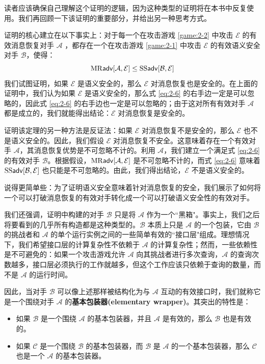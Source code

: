 读者应该确保自己理解这个证明的逻辑，因为这种类型的证明将在本书中反复使用。我们再回顾一下该证明的重要部分，并给出另一种思考方式。

证明的核心建立在以下事实上：对于每一个在攻击游戏 \ref{game:2-2} 中攻击 $\mathcal{E}$ 的有效消息恢复对手 $\mathcal{A}$ ，都存在一个在攻击游戏 \ref{game:2-1} 中攻击 $\mathcal{E}$ 的有效语义安全对手 $\mathcal{B}$，使得：
\begin{equation}\label{eq:2-6}
{\rm MR\mathsf{adv}}[\mathcal{A},\mathcal{E}]\leq{\rm SS\mathsf{adv}}[\mathcal{B},\mathcal{E}]
\end{equation}
我们试图证明，如果 $\mathcal{E}$ 是语义安全的，那么 $\mathcal{E}$ 对消息恢复也是安全的。在上面的证明中，我们认为如果 $\mathcal{E}$ 是语义安全的，那么式 \ref{eq:2-6} 的右手边一定是可以忽略的，因此式 \ref{eq:2-6} 的右手边也一定是可以忽略的；由于这对所有有效对手 $\mathcal{A}$ 都是成立的，我们就能得出结论：$\mathcal{E}$ 对消息恢复是安全的。

证明该定理的另一种方法是反证法：如果 $\mathcal{E}$ 对消息恢复不是安全的，那么 $\mathcal{E}$ 也不是语义安全的。因此，我们假设 $\mathcal{E}$ 对消息恢复不安全。这意味着存在一个有效对手 $\mathcal{A}$，其消息恢复优势是不可忽略不计的。利用 $\mathcal{A}$，我们建立一个满足式 \ref{eq:2-6} 的有效对手 $\mathcal{B}$。根据假设，${\rm MR\mathsf{adv}}[\mathcal{A},\mathcal{E}]$ 是不可忽略不计的，而式 \ref{eq:2-6} 意味着 ${\rm SS\mathsf{adv}}[\mathcal{B},\mathcal{E}]$ 也只能是不可忽略的。由此，我们得出结论，$\mathcal{E}$ 不是语义安全的。

说得更简单些：为了证明语义安全意味着针对消息恢复的安全，我们展示了如何将一个可以打破消息恢复的有效对手转化成一个可以打破语义安全性的有效对手。

我们还强调，证明中构建的对手 $\mathcal{B}$ 只是将 $\mathcal{A}$ 作为一个``黑箱"。事实上，我们之后将要看到的几乎所有构造都是这种类型的。$\mathcal{B}$ 本质上只是 $\mathcal{A}$ 的一个包装，它由 $\mathcal{B}$ 的挑战者和 $\mathcal{A}$ 的单个运行实例之间的一些简单有效的``接口层"组成。理想情况下，我们希望接口层的计算复杂性不依赖于 $\mathcal{A}$ 的计算复杂性；然而，一些依赖性是不可避免的：如果一个攻击游戏允许 $\mathcal{A}$ 向其挑战者进行多次查询，$\mathcal{A}$ 的查询次数越多，接口层必须执行的工作就越多，但这个工作应该只依赖于查询的数量，而不是 $\mathcal{A}$ 的运行时间。

因此，当对手 $\mathcal{B}$ 可以像上述那样被结构化为与 $\mathcal{A}$ 互动的有效接口时，我们就称它是一个围绕对手 $\mathcal{A}$ 的\textbf{基本包装器(elementary wrapper)}。其突出的特性是：
\begin{itemize}
	\item 如果 $\mathcal{B}$ 是一个围绕 $\mathcal{A}$ 的基本包装器，并且 $\mathcal{A}$ 是有效的，那么 $\mathcal{B}$ 也是有效的。
	\item 如果 $\mathcal{C}$ 是一个围绕 $\mathcal{B}$ 的基本包装器，而 $\mathcal{B}$ 是 $\mathcal{A}$ 的一个基本包装器，那么 $\mathcal{C}$ 也是一个 $\mathcal{A}$ 的基本包装器。
\end{itemize}

